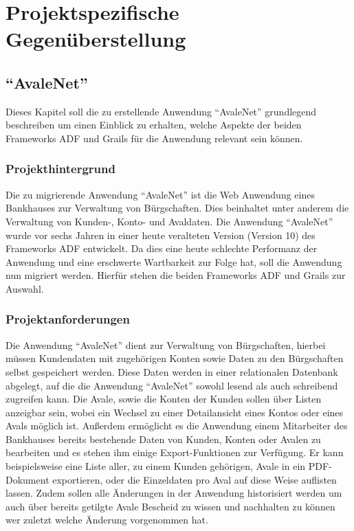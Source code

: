 \section{Projektspezifische Gegenüberstellung}
\subsection{"`AvaleNet"'}
Dieses Kapitel soll die zu erstellende Anwendung "`AvaleNet"' grundlegend beschreiben um einen Einblick zu erhalten, welche Aspekte der beiden Frameworks ADF und Grails für die Anwendung relevant sein können.
\subsubsection{Projekthintergrund}
Die zu migrierende Anwendung "`AvaleNet"' ist die Web Anwendung eines Bankhauses zur Verwaltung von Bürgschaften. Dies beinhaltet unter anderem die Verwaltung von Kunden-, Konto- und Avaldaten. Die Anwendung "`AvaleNet"' wurde vor sechs Jahren in einer heute veralteten Version (Version 10) des Frameworks ADF entwickelt. Da dies eine heute schlechte Performanz der Anwendung und eine erschwerte Wartbarkeit zur Folge hat, soll die Anwendung nun migriert werden. Hierfür stehen die beiden Frameworks ADF und Grails zur Auswahl.
\subsubsection{Projektanforderungen}
Die Anwendung "`AvaleNet"' dient zur Verwaltung von Bürgschaften, hierbei müssen Kundendaten mit zugehörigen Konten sowie Daten zu den Bürgschaften selbst gespeichert werden. Diese Daten werden in einer relationalen Datenbank abgelegt, auf die die Anwendung "`AvaleNet"' sowohl lesend als auch schreibend zugreifen kann. Die Avale, sowie die Konten der Kunden sollen über Listen anzeigbar sein, wobei ein Wechsel zu einer Detailansicht eines Kontos oder eines Avals möglich ist. Außerdem ermöglicht es die Anwendung einem Mitarbeiter des Bankhauses bereits bestehende Daten von Kunden, Konten oder Avalen zu bearbeiten und es stehen ihm einige Export-Funktionen zur Verfügung. Er kann beispielsweise eine Liste aller, zu einem Kunden gehörigen, Avale in ein PDF-Dokument exportieren, oder die Einzeldaten pro Aval auf diese Weise auflisten lassen. Zudem sollen alle Änderungen in der Anwendung historisiert werden um auch über bereits getilgte Avale Bescheid zu wissen und nachhalten zu können wer zuletzt welche Änderung vorgenommen hat.

